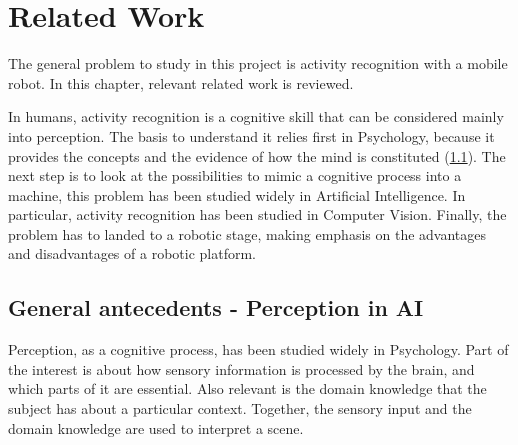 \documentclass[a4paper, 12pt, openany, oneside]{book}
\begin{document}
\pagestyle{emty} %

\cleardoublepage

\newpage
{}
\tableofcontents

\newpage
\pagestyle{plain}


\chapter{Related Work}

The general problem to study in this project is activity recognition with a mobile robot. 
In this chapter, relevant related work is reviewed.

In humans, activity recognition is a cognitive skill that can be considered mainly into perception. 
The basis to understand it relies first in Psychology, because it provides the concepts and the evidence of how the mind is constituted (\ref{ch_LitRev_Perception}). 
The next step is to look at the possibilities to mimic a cognitive process into a machine, this problem has been studied widely in Artificial Intelligence. %
In particular, activity recognition has been studied in Computer Vision. %
Finally, the problem has to landed to a robotic stage, making emphasis on the advantages and disadvantages of a robotic platform. %


\section{General antecedents - Perception in AI} \label{ch_LitRev_Perception}

Perception, as a cognitive process, has been studied widely in Psychology.  
Part of the interest is about how sensory information is processed by the brain, and which parts of it are essential.
Also relevant is the domain knowledge that the subject has about a particular context.
Together, the sensory input and the domain knowledge are used to interpret a scene.
\end{document}
